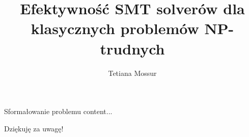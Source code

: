 \documentclass{beamer}
\title{Efektywność SMT solverów dla klasycznych problemów NP-trudnych}
\author{Tetiana Mossur}
\institute[UJD]
{
	Uniwersytet Jana Długosza w Częstochowie \\
	\medskip
}
\date{}
\begin{document}
	
	\begin{frame}
		\titlepage
	\end{frame}


	\begin{frame}{Sformałowanie problemu}
		content...
	\end{frame}
	
	
	\begin{frame}
		\Huge{\centerline{Dziękuję za uwagę!}}
	\end{frame}
	
	

	
\end{document}
